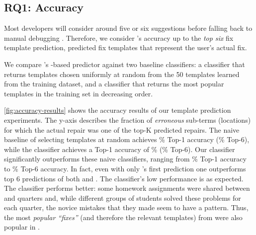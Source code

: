 \subsection{RQ1: Accuracy}

\label{sec:eval:accuracy}

Most developers will consider around five or six suggestions before falling back
to manual debugging \citep{Kochhar2016-oc,Parnin2011-ce}.
%
Therefore, we consider \toolname's accuracy up to the \emph{top six} fix
template prediction, \ie predicted fix templates that represent the user's
actual fix.

%
We compare \toolname's \dnn-based predictor against two baseline classifiers: a
\random classifier that returns templates chosen uniformly at random from the 50
templates learned from the \SPRING training dataset, and a \popular classifier
that returns the most popular templates in the training set in decreasing order.

%
\autoref{fig:accuracy-results} shows the accuracy results of our template
prediction experiments. The y-axis describes the fraction of \emph{erroneous}
sub-terms (locations) for which the actual repair was one of the top-K predicted
repairs.
%
The naive baseline of selecting templates at random achieves
\RandomTopOne\% Top-1 accuracy (\RandomTopSix\% Top-6), while
the \popular classifier achieves a Top-1 accuracy of \PopularTopOne\%
(\PopularTopSix\% Top-6).
%
Our \dnn classifier significantly outperforms these naive classifiers, ranging
from \DnnTopOne\% Top-1 accuracy to \DnnTopSix\% Top-6 accuracy.
%
In fact, even with only \dnn's first prediction one outperforms top 6
predictions of both \random and \popular.
%
The \random classifier's low performance is as expected.
%
The \popular classifier performs better: some homework assignments were shared
between \SPRING and \FALL quarters and, while different groups of students
solved these problems for each quarter, the novice mistakes that they made seem
to have a pattern. Thus, the most \emph{popular ``fixes''} (and therefore the
relevant templates) from \SPRING were also popular in \FALL.



